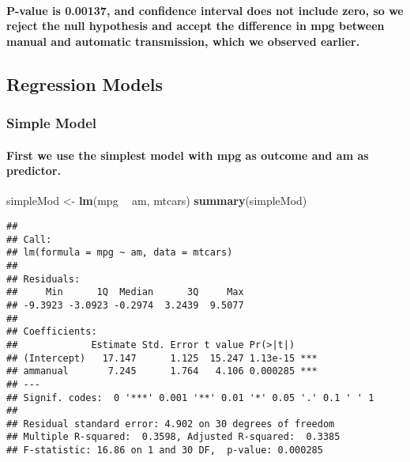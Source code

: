 \documentclass[]{article}
\newenvironment{Shaded}{\begin{snugshade}}{\end{snugshade}}
\newcommand{\KeywordTok}[1]{\textcolor[rgb]{0.13,0.29,0.53}{\textbf{#1}}}
\newcommand{\NormalTok}[1]{#1}
\newcommand{\OperatorTok}[1]{\textcolor[rgb]{0.81,0.36,0.00}{\textbf{#1}}}
\newcommand{\StringTok}[1]{\textcolor[rgb]{0.31,0.60,0.02}{#1}}
\let\oldparagraph\paragraph
\renewcommand{\paragraph}[1]{\oldparagraph{#1}\mbox{}}
\begin{document}
\hypertarget{p-value-is-0.00137-and-confidence-interval-does-not-include-zero-so-we-reject-the-null-hypothesis-and-accept-the-difference-in-mpg-between-manual-and-automatic-transmission-which-we-observed-earlier.}{%
\paragraph{P-value is 0.00137, and confidence interval does not include
zero, so we reject the null hypothesis and accept the difference in mpg
between manual and automatic transmission, which we observed
earlier.}\label{p-value-is-0.00137-and-confidence-interval-does-not-include-zero-so-we-reject-the-null-hypothesis-and-accept-the-difference-in-mpg-between-manual-and-automatic-transmission-which-we-observed-earlier.}}

\hypertarget{regression-models}{%
\subsection{Regression Models}\label{regression-models}}

\hypertarget{simple-model}{%
\subsubsection{Simple Model}\label{simple-model}}

\hypertarget{first-we-use-the-simplest-model-with-mpg-as-outcome-and-am-as-predictor.}{%
\paragraph{First we use the simplest model with mpg as outcome and am as
predictor.}\label{first-we-use-the-simplest-model-with-mpg-as-outcome-and-am-as-predictor.}}

\begin{Shaded}
\begin{Highlighting}[]
\NormalTok{simpleMod <-}\StringTok{ }\KeywordTok{lm}\NormalTok{(mpg }\OperatorTok{~}\StringTok{ }\NormalTok{am, mtcars)}
\KeywordTok{summary}\NormalTok{(simpleMod)}
\end{Highlighting}
\end{Shaded}

\begin{verbatim}
## 
## Call:
## lm(formula = mpg ~ am, data = mtcars)
## 
## Residuals:
##     Min      1Q  Median      3Q     Max 
## -9.3923 -3.0923 -0.2974  3.2439  9.5077 
## 
## Coefficients:
##             Estimate Std. Error t value Pr(>|t|)    
## (Intercept)   17.147      1.125  15.247 1.13e-15 ***
## ammanual       7.245      1.764   4.106 0.000285 ***
## ---
## Signif. codes:  0 '***' 0.001 '**' 0.01 '*' 0.05 '.' 0.1 ' ' 1
## 
## Residual standard error: 4.902 on 30 degrees of freedom
## Multiple R-squared:  0.3598, Adjusted R-squared:  0.3385 
## F-statistic: 16.86 on 1 and 30 DF,  p-value: 0.000285
\end{verbatim}
\end{document}
